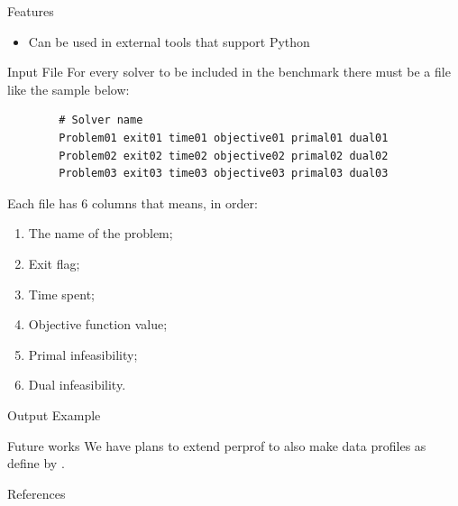 \documentclass[paperwidth=90cm,paperheight=120cm,portrait]{baposter}
\begin{document}
\begin{poster}
\begin{posterbox}[name=features,below=perprof-py]{Features}
\begin{itemize}
          \item Can be used in external tools that support Python
        \end{itemize}

    \end{posterbox}

 \begin{posterbox}[name=inputfile,column=1,span=2]{Input File}  
        For every solver to be included in the benchmark there must be a file like
        the sample below:

        \begin{lstlisting}
        # Solver name
        Problem01 exit01 time01 objective01 primal01 dual01
        Problem02 exit02 time02 objective02 primal02 dual02
        Problem03 exit03 time03 objective03 primal03 dual03
        \end{lstlisting}

        Each file has 6 columns that means, in order:
        \begin{multicols}{2} 
          
        \begin{enumerate}
          \item The name of the problem;
          \item Exit flag;
          \item Time spent;
          \item Objective function value;
          \item Primal infeasibility;
          \item Dual infeasibility.
        \end{enumerate}
        \end{multicols} 
   \end{posterbox}
       \begin{posterbox}[name=output,column=1,span=2,below=inputfile]{Output Example}
        
       \end{posterbox}

      \begin{posterbox}[name=future,column=1,below=output,span=2]{Future works}
         We have plans to extend perprof to also make data profiles as define by
         \textcite{More2009}.
       \end{posterbox}


\begin{posterbox}[name=references,span=2,column=1,below=future]{References}
\smaller                          %
        \printbibliography[heading=none]

\end{posterbox}
   

\end{poster}
\end{document}
